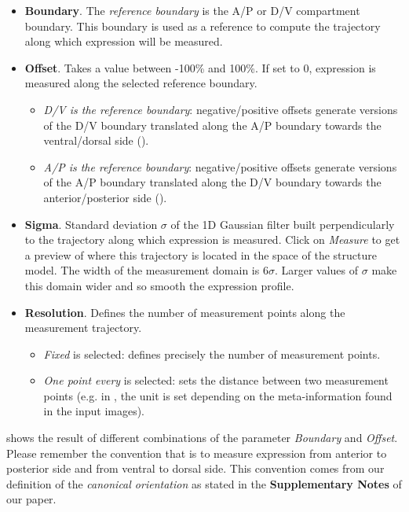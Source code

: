 \begin{itemize}
 \item \textbf{Boundary}. The \textit{reference boundary} is the A/P or D/V compartment boundary. This boundary is used as a reference to compute the trajectory along which expression will be measured.
 \item \textbf{Offset}. Takes a value between -100\% and 100\%. If set to 0, expression is measured along the selected reference boundary.
    \begin{itemize}
     \item \textit{D/V is the reference boundary}: negative/positive offsets generate versions of the D/V boundary translated along the A/P boundary towards the ventral/dorsal side ().
     \item \textit{A/P is the reference boundary}: negative/positive offsets generate versions of the A/P boundary translated along the D/V boundary towards the anterior/posterior side ().
    \end{itemize}
 \item \textbf{Sigma}. Standard deviation $\sigma$ of the 1D Gaussian filter built perpendicularly to the trajectory along which expression is measured. Click on \textit{Measure} to get a preview of where this trajectory is located in the space of the structure model. The width of the measurement domain is $6\sigma$. Larger values of $\sigma$ make this domain wider and so smooth the expression profile.
 \item \textbf{Resolution}. Defines the number of measurement points along the measurement trajectory.
    \begin{itemize}
     \item \textit{Fixed} is selected: defines precisely the number of measurement points.
     \item \textit{One point every} is selected: sets the distance between two measurement points (e.g. in \mum, the unit is set depending on the meta-information found in the input images).
    \end{itemize}
\end{itemize}

 shows the result of different combinations of the parameter \textit{Boundary} and \textit{Offset}. Please remember the convention that is to measure expression from anterior to posterior side and from ventral to dorsal side. This convention comes from our definition of the \emph{canonical orientation} as stated in the \textbf{Supplementary Notes} of our paper\autocite{schaffter2013}.

